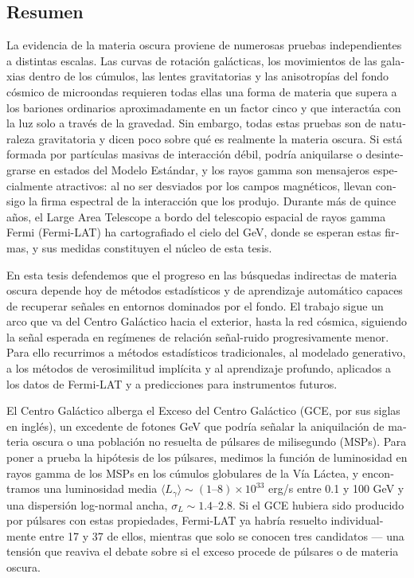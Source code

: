 \begin{otherlanguage}{spanish}
\chapter*{Resumen}

La evidencia de la materia oscura proviene de numerosas pruebas independientes a distintas escalas. Las curvas de rotación galácticas, los movimientos de las galaxias dentro de los cúmulos, las lentes gravitatorias y las anisotropías del fondo cósmico de microondas requieren todas ellas una forma de materia que supera a los bariones ordinarios aproximadamente en un factor cinco y que interactúa con la luz solo a través de la gravedad. Sin embargo, todas estas pruebas son de naturaleza gravitatoria y dicen poco sobre qué es realmente la materia oscura. Si está formada por partículas masivas de interacción débil, podría aniquilarse o desintegrarse en estados del Modelo Estándar, y los rayos gamma son mensajeros especialmente atractivos: al no ser desviados por los campos magnéticos, llevan consigo la firma espectral de la interacción que los produjo. Durante más de quince años, el Large Area Telescope a bordo del telescopio espacial de rayos gamma Fermi (Fermi-LAT) ha cartografiado el cielo del GeV, donde se esperan estas firmas, y sus medidas constituyen el núcleo de esta tesis.

En esta tesis defendemos que el progreso en las búsquedas indirectas de materia oscura depende hoy de métodos estadísticos y de aprendizaje automático capaces de recuperar señales en entornos dominados por el fondo. El trabajo sigue un arco que va del Centro Galáctico hacia el exterior, hasta la red cósmica, siguiendo la señal esperada en regímenes de relación señal-ruido progresivamente menor. Para ello recurrimos a métodos estadísticos tradicionales, al modelado generativo, a los métodos de verosimilitud implícita y al aprendizaje profundo, aplicados a los datos de Fermi-LAT y a predicciones para instrumentos futuros.

El Centro Galáctico alberga el Exceso del Centro Galáctico (GCE, por sus siglas en inglés), un excedente de fotones GeV que podría señalar la aniquilación de materia oscura o una población no resuelta de púlsares de milisegundo (MSPs). Para poner a prueba la hipótesis de los púlsares, medimos la función de luminosidad en rayos gamma de los MSPs en los cúmulos globulares de la Vía Láctea, y encontramos una luminosidad media $\langle L_\gamma\rangle \sim (1\text{--}8)\times10^{33}$ erg/s entre 0.1 y 100 GeV y una dispersión log-normal ancha, $\sigma_L \sim 1.4\text{--}2.8$. Si el GCE hubiera sido producido por púlsares con estas propiedades, Fermi-LAT ya habría resuelto individualmente entre 17 y 37 de ellos, mientras que solo se conocen tres candidatos --- una tensión que reaviva el debate sobre si el exceso procede de púlsares o de materia oscura.


\end{otherlanguage}
